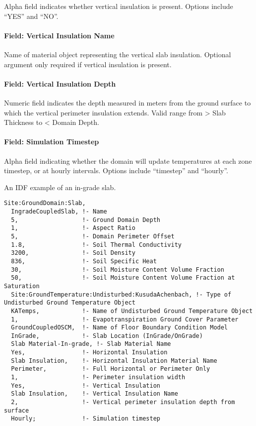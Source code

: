 Alpha field indicates whether vertical insulation is present. Options include ``YES'' and ``NO''.

\paragraph{Field: Vertical Insulation Name}\label{field-vertical-insulation-name}

Name of material object representing the vertical slab insulation. Optional argument only required if vertical insulation is present.

\paragraph{Field: Vertical Insulation Depth}\label{field-vertical-insulation-depth}

Numeric field indicates the depth measured in meters from the ground surface to which the vertical perimeter insulation extends. Valid range from \textgreater{} Slab Thickness to \textless{} Domain Depth.

\paragraph{Field: Simulation Timestep}\label{field-simulation-timestep}

Alpha field indicating whether the domain will update temperatures at each zone timestep, or at hourly intervals. Options include ``timestep'' and ``hourly''.

An IDF example of an in-grade slab.

\begin{lstlisting}
Site:GroundDomain:Slab,
  IngradeCoupledSlab, !- Name
  5,                  !- Ground Domain Depth
  1,                  !- Aspect Ratio
  5,                  !- Domain Perimeter Offset
  1.8,                !- Soil Thermal Conductivity
  3200,               !- Soil Density
  836,                !- Soil Specific Heat
  30,                 !- Soil Moisture Content Volume Fraction
  50,                 !- Soil Moisture Content Volume Fraction at Saturation
  Site:GroundTemperature:Undisturbed:KusudaAchenbach, !- Type of Undisturbed Ground Temperature Object
  KATemps,            !- Name of Undisturbed Ground Temperature Object
  1,                  !- Evapotranspiration Ground Cover Parameter
  GroundCoupledOSCM,  !- Name of Floor Boundary Condition Model
  InGrade,            !- Slab Location (InGrade/OnGrade)
  Slab Material-In-grade, !- Slab Material Name
  Yes,                !- Horizontal Insulation
  Slab Insulation,    !- Horizontal Insulation Material Name
  Perimeter,          !- Full Horizontal or Perimeter Only
  1,                  !- Perimeter insulation width
  Yes,                !- Vertical Insulation
  Slab Insulation,    !- Vertical Insulation Name
  2,                  !- Vertical perimeter insulation depth from surface
  Hourly;             !- Simulation timestep
\end{lstlisting}

